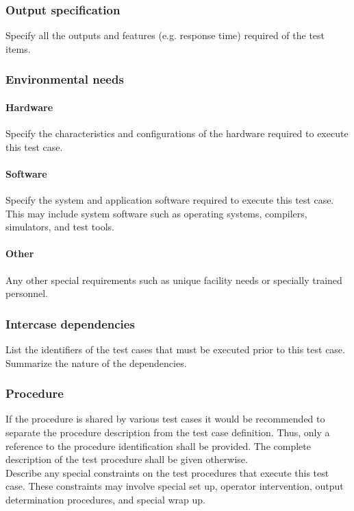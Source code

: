 \documentclass[DM,lsstdraft,STS,toc]{lsstdoc}
\begin{document}
\subsubsection{Output specification \label{sect:tcoutput}}
Specify all the outputs and features (e.g. response time) required of the test items.

\subsubsection{Environmental needs \label{sect:tcenvironment}}
\paragraph{Hardware \label{sect:tchw}}
Specify the characteristics and configurations of the hardware required to execute this test case.
\paragraph{Software \label{sect:tcsw}}
Specify the system and application software required to execute this test case. This may include system software such as operating
systems, compilers, simulators, and test tools.
\paragraph{Other \label{sect:tcother}}
Any other special requirements such as unique facility needs or specially trained personnel.

\subsubsection{Intercase dependencies}
List the identifiers of the test cases that must be executed prior to this test case. Summarize the nature of the dependencies.

\subsubsection{Procedure}
If the procedure is shared by various test cases it would be recommended to separate the procedure description from the test
case definition. Thus, only a reference to the procedure identification shall be provided. The complete description of
the test procedure shall be given otherwise. \\

Describe any special constraints on the test procedures that execute this test case. These constraints may involve special set
up, operator intervention, output determination procedures, and special wrap up.
\end{document}
